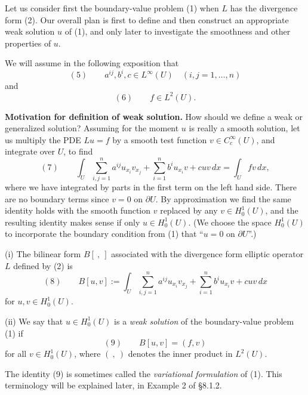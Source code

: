 Let us consider first the boundary-value problem (1) when $L$ has the divergence form (2). Our overall plan is first to define and then construct an appropriate weak solution $u$ of (1), and only later to investigate the smoothness and other properties of $u$.

We will assume in the following exposition that
$$(5) \qquad a^{ij}, b^i, c \in L^\infty(U) \quad (i,j=1,\ldots,n)$$
and
$$(6) \qquad f \in L^2(U).$$

\textbf{Motivation for definition of weak solution.} How should we define a weak or generalized solution? Assuming for the moment $u$ is really a smooth solution, let us multiply the PDE $Lu = f$ by a smooth test function $v \in C_c^\infty(U)$, and integrate over $U$, to find
$$(7) \qquad \int_U \sum_{i,j=1}^n a^{ij}u_{x_i}v_{x_j} + \sum_{i=1}^n b^iu_{x_i}v + cuv \, dx = \int_U fv \, dx,$$
where we have integrated by parts in the first term on the left hand side. There are no boundary terms since $v = 0$ on $\partial U$. By approximation we find the same identity holds with the smooth function $v$ replaced by any $v \in H_0^1(U)$, and the resulting identity makes sense if only $u \in H_0^1(U)$. (We choose the space $H_0^1(U)$ to incorporate the boundary condition from (1) that ``$u = 0$ on $\partial U$''.)

\begin{definition}
\label{def:bilinear-form-weak-solution-l2}
(i) The bilinear form $B[\ ,\ ]$ associated with the divergence form elliptic operator $L$ defined by (2) is
$$(8) \qquad B[u,v] := \int_U \sum_{i,j=1}^n a^{ij}u_{x_i}v_{x_j} + \sum_{i=1}^n b^iu_{x_i}v + cuv \, dx$$
for $u,v \in H_0^1(U)$.

(ii) We say that $u \in H_0^1(U)$ is a \textit{weak solution} of the boundary-value problem (1) if
$$(9) \qquad B[u,v] = (f,v)$$
for all $v \in H_0^1(U)$, where $(\ ,\ )$ denotes the inner product in $L^2(U)$.
\end{definition}

\begin{remark}
\label{rem:variational-formulation}
The identity (9) is sometimes called the \textit{variational formulation} of (1). This terminology will be explained later, in Example 2 of \S8.1.2.
\end{remark}

